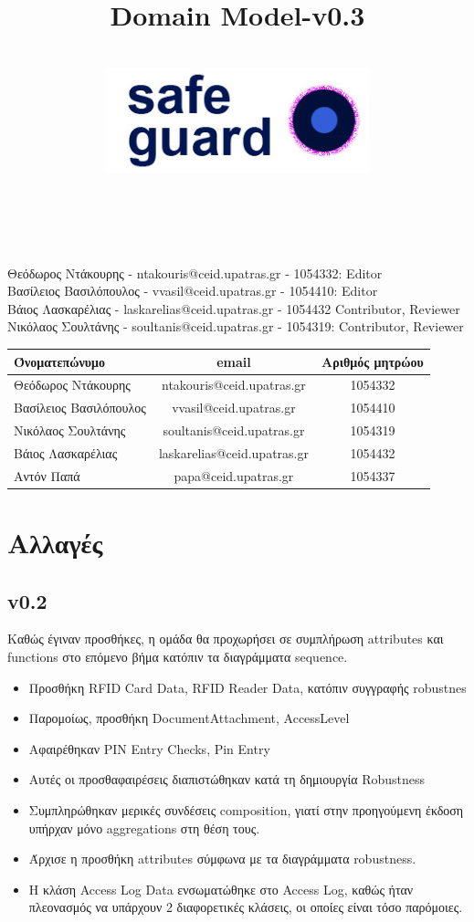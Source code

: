 \documentclass{article}
\title{Domain Model-v0.3}
\author{\\
\includegraphics[width=3in]{safeguard}\\[1ex]\\\\
}
\begin{document}
\maketitle

\newpage

Θεόδωρος Ντάκουρης - ntakouris@ceid.upatras.gr - 1054332: Editor \\
Βασίλειος Βασιλόπουλος - vvasil@ceid.upatras.gr - 1054410: Editor \\
Βάιος Λασκαρέλιας - laskarelias@ceid.upatras.gr - 1054432 Contributor, Reviewer \\
Νικόλαος Σουλτάνης - soultanis@ceid.upatras.gr - 1054319: Contributor, Reviewer \\

\begin{tabular}{|l|c|c|}
\hline
Όνοματεπώνυμο & email & Αριθμός μητρώου  \\
\hline
Θεόδωρος Ντάκουρης & ntakouris@ceid.upatras.gr & 1054332 \\
Βασίλειος Βασιλόπουλος & vvasil@ceid.upatras.gr &  1054410 \\
Νικόλαος Σουλτάνης & soultanis@ceid.upatras.gr & 1054319  \\
Βάιος Λασκαρέλιας & laskarelias@ceid.upatras.gr & 1054432 \\
Αντόν Παπά & papa@ceid.upatras.gr & 1054337 \\
\hline
\end{tabular}

\renewcommand{\contentsname}{Περιεχόμενα}
\tableofcontents

\section{Αλλαγές}
\subsection{v0.2}
Καθώς έγιναν προσθήκες, η ομάδα θα προχωρήσει σε συμπλήρωση attributes και functions στο επόμενο βήμα κατόπιν τα διαγράμματα sequence.

\begin{itemize}
    \item Προσθήκη RFID Card Data, RFID Reader Data, κατόπιν συγγραφής robustnes
    \item Παρομοίως, προσθήκη DocumentAttachment, AccessLevel
    \item Αφαιρέθηκαν PIN Entry Checks, Pin Entry 
    \item Αυτές οι προσθαφαιρέσεις διαπιστώθηκαν κατά τη δημιουργία Robustness
    \item Συμπληρώθηκαν μερικές συνδέσεις composition, γιατί στην προηγούμενη έκδοση υπήρχαν μόνο aggregations στη θέση τους.
    \hline
    \item Άρχισε η προσθήκη attributes σύμφωνα με τα διαγράμματα robustness.
    \item Η κλάση Access Log Data ενσωματώθηκε στο Access Log, καθώς ήταν πλεονασμός να υπάρχουν 2 διαφορετικές κλάσεις, οι οποίες είναι τόσο παρόμοιες.
\end{itemize}
\end{document}
